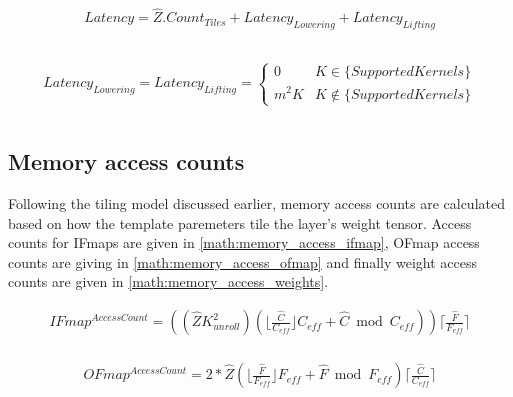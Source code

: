\begin{align}
    \begin{gathered}
        Latency = \hat{Z}.Count_{Tiles} + Latency_{Lowering} + Latency_{Lifting} \\
                \end{gathered}
    \label{math:latency}
\end{align}

\begin{align}
    \begin{gathered}
        Latency_{Lowering} = Latency_{Lifting} = \begin{cases} 0 &  K \in \{SupportedKernels\}\\ m^{2}K & K \notin \{SupportedKernels\}\end{cases} \\
                \end{gathered}
    \label{math:latency_lowering_lifting}
\end{align}

\subsection{Memory access counts}
\label{chap:dataflow_dse:exploring:tempo_model:access_counts}

Following the tiling model discussed earlier, memory access counts are
calculated based on how the template paremeters tile the layer's weight tensor.
Access counts for IFmaps are given in \autoref{math:memory_access_ifmap}, OFmap
access counts are giving in \autoref{math:memory_access_ofmap} and finally
weight access counts are given in \autoref{math:memory_access_weights}.

\begin{equation}
    \begin{aligned}
        IFmap^{AccessCount} = ((\hat{Z} K_{unroll}^2) (\lfloor\frac{\hat{C}}{C_{eff}} \rfloor C_{eff} + \hat{C}\bmod C_{eff}))\lceil\frac{\hat{F}}{F_{eff}}\rceil \\
    \end{aligned}
    \label{math:memory_access_ifmap}
\end{equation}
  
\begin{equation}
    \begin{aligned}
        OFmap^{AccessCount} = 2*\hat{Z} (\lfloor\frac{\hat{F}}{F_{eff}}\rfloor F_{eff}+\hat{F}\bmod F_{eff}) \lceil\frac{\hat{C}}{C_{eff}}\rceil \\
    \end{aligned}
    \label{math:memory_access_ofmap}
\end{equation}

